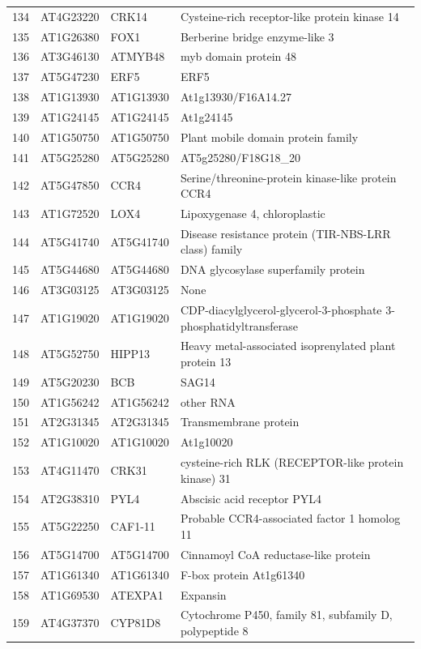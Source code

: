 \documentclass[11pt]{article}
\begin{document}
\begin{center}
\begin{tabular}{rlll}
134 & AT4G23220 & CRK14 & Cysteine-rich receptor-like protein kinase 14\\
135 & AT1G26380 & FOX1 & Berberine bridge enzyme-like 3\\
136 & AT3G46130 & ATMYB48 & myb domain protein 48\\
137 & AT5G47230 & ERF5 & ERF5\\
138 & AT1G13930 & AT1G13930 & At1g13930/F16A14.27\\
139 & AT1G24145 & AT1G24145 & At1g24145\\
140 & AT1G50750 & AT1G50750 & Plant mobile domain protein family\\
141 & AT5G25280 & AT5G25280 & AT5g25280/F18G18\_20\\
142 & AT5G47850 & CCR4 & Serine/threonine-protein kinase-like protein CCR4\\
143 & AT1G72520 & LOX4 & Lipoxygenase 4, chloroplastic\\
144 & AT5G41740 & AT5G41740 & Disease resistance protein (TIR-NBS-LRR class) family\\
145 & AT5G44680 & AT5G44680 & DNA glycosylase superfamily protein\\
146 & AT3G03125 & AT3G03125 & None\\
147 & AT1G19020 & AT1G19020 & CDP-diacylglycerol-glycerol-3-phosphate 3-phosphatidyltransferase\\
148 & AT5G52750 & HIPP13 & Heavy metal-associated isoprenylated plant protein 13\\
149 & AT5G20230 & BCB & SAG14\\
150 & AT1G56242 & AT1G56242 & other RNA\\
151 & AT2G31345 & AT2G31345 & Transmembrane protein\\
152 & AT1G10020 & AT1G10020 & At1g10020\\
153 & AT4G11470 & CRK31 & cysteine-rich RLK (RECEPTOR-like protein kinase) 31\\
154 & AT2G38310 & PYL4 & Abscisic acid receptor PYL4\\
155 & AT5G22250 & CAF1-11 & Probable CCR4-associated factor 1 homolog 11\\
156 & AT5G14700 & AT5G14700 & Cinnamoyl CoA reductase-like protein\\
157 & AT1G61340 & AT1G61340 & F-box protein At1g61340\\
158 & AT1G69530 & ATEXPA1 & Expansin\\
159 & AT4G37370 & CYP81D8 & Cytochrome P450, family 81, subfamily D, polypeptide 8\\

\end{tabular}
\end{center}
\end{document}
